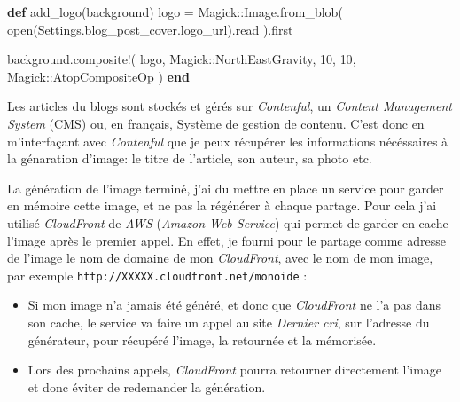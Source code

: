 \documentclass[12pt,a4paper]{article}
\newenvironment{Shaded}{}{}
\newcommand{\KeywordTok}[1]{\textcolor[rgb]{0.00,0.44,0.13}{\textbf{{#1}}}}
\newcommand{\DataTypeTok}[1]{\textcolor[rgb]{0.56,0.13,0.00}{{#1}}}
\newcommand{\DecValTok}[1]{\textcolor[rgb]{0.25,0.63,0.44}{{#1}}}
\newcommand{\CommentTok}[1]{\textcolor[rgb]{0.38,0.63,0.69}{\textit{{#1}}}}
\newcommand{\VariableTok}[1]{\textcolor[rgb]{0.10,0.09,0.49}{{#1}}}
\newcommand{\ExtensionTok}[1]{{#1}}
\newcommand{\NormalTok}[1]{{#1}}
\begin{document}
  \begin{Shaded}
  \end{Shaded}

  \begin{Shaded}
  \begin{Highlighting}[]
  \KeywordTok{def} \NormalTok{add_logo(background)}
    \NormalTok{logo = }\DataTypeTok{Magick}\NormalTok{::}\DataTypeTok{Image}\NormalTok{.from_blob(}
      \NormalTok{open(}\DataTypeTok{Settings}\NormalTok{.blog_post_cover.logo_url).read}
    \NormalTok{).first}

    \NormalTok{background.composite!(}
      \NormalTok{logo,}
      \DataTypeTok{Magick}\NormalTok{::}\DataTypeTok{NorthEastGravity}\NormalTok{,}
      \DecValTok{10}\NormalTok{,}
      \DecValTok{10}\NormalTok{,}
      \DataTypeTok{Magick}\NormalTok{::}\DataTypeTok{AtopCompositeOp}
    \NormalTok{)}
  \KeywordTok{end}
  \end{Highlighting}
  \end{Shaded}

  \bigskip

  Les articles du blogs sont stockés et gérés sur \emph{Contenful}, un
  \emph{Content Management System} (CMS) ou, en français, Système de
  gestion de contenu. C'est donc en m'interfaçant avec \emph{Contenful}
  que je peux récupérer les informations nécéssaires à la génaration
  d'image: le titre de l'article, son auteur, sa photo etc.

  \bigskip

  La génération de l'image terminé, j'ai du mettre en place un service
  pour garder en mémoire cette image, et ne pas la régénérer à chaque
  partage. Pour cela j'ai utilisé \emph{CloudFront} de \emph{AWS}
  (\emph{Amazon Web Service}) qui permet de garder en cache l'image après
  le premier appel. En effet, je fourni pour le partage comme adresse de
  l'image le nom de domaine de mon \emph{CloudFront}, avec le nom de mon
  image, par exemple \texttt{http://XXXXX.cloudfront.net/monoide} :

  \begin{itemize}
  \item
    Si mon image n'a jamais été généré, et donc que \emph{CloudFront} ne
    l'a pas dans son cache, le service va faire un appel au site
    \emph{Dernier cri}, sur l'adresse du générateur, pour récupéré
    l'image, la retournée et la mémorisée.
  \item
    Lors des prochains appels, \emph{CloudFront} pourra retourner
    directement l'image et donc éviter de redemander la génération.
  \end{itemize}
\end{document}
